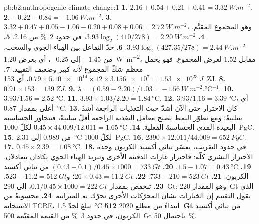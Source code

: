 \begin{solution}{pb:b2:anthropogenic-climate-change:1}
\textbf{1.} $2.16 + 0.54 + 0.21 + 0.41 = \qty{3.32}{W.m^{-2}}$.
\textbf{2.} $-0.22 - 0.84 = \qty{-1.06}{W.m^{-2}}$.
\textbf{3.} $3.32 + 0.47 + 0.05 - 1.06 - 0.20 + 0.08 + 0.06 = \qty{2.72}{W.m^{-2}}$، وهو المجموع
المقيَّم.
\textbf{4.} $3.93\log_2(410/278) = \qty{2.20}{W.m^{-2}}$، في حدود \qty{2}{\percent} من 2.16.
\textbf{5.} $3.93\log_2(427.35/278) = \qty{2.44}{W.m^{-2}}$.
\textbf{6.} حدّ التفاعل بين الهباء الجوي والسحب، من $-1.45$ إلى $-0.25$، أي بعرض \qty{1.20}{W.m^{-2}}، مقابل 1.52 لعرض
المجموع: فهو يحمل معظم شكّ المجموع لأنه كبير وضعيف
التقييد.
\textbf{7.} $0.79 \times \num{5.10e14} \times 12 \times \num{3.156e7} = \qty{1.53e23}{J}$، أي
\qty{153}{ZJ}.
\textbf{8.} $0.91 \times 153 = \qty{139}{ZJ}$.
\textbf{9.} $\lambda = (0.59 - 2.20)/1.03 = \qty{-1.56}{W.m^{-2}.\celsius^{-1}}$.
\textbf{10.} $3.93/1.56 = \qty{2.52}{\celsius}$.
\textbf{11.} $3.93 \times 1.03/2.20 = \qty{1.84}{\celsius}$.
\textbf{12.} $3.93/1.16 = \qty{3.39}{\celsius}$، أي أعلى بمقدار \qty{0.87}{\celsius}.
\textbf{13.} كان الاحترار حتى الآن أشدّ حيث التغذيات الراجعة أشدّ سلبيةً؛ ومع تطوّر
النمط يصبح معامل التغذية الراجعة أقلّ سلبيةً، فتتجاوز الحساسية البعيدة المدى
الحساسيةَ الفعلية.
\textbf{14.} $0.45 \times 44.009/12.011 = \qty{1.65}{\celsius}$ لكلّ \qty{1000}{PgC}.
\textbf{15.} من 0.989 إلى \qty{2.31}{\celsius} لكلّ \qty{1000}{PgC}.
\textbf{16.} $2390 \times 12.011/44.009 = \qty{652}{PgC}$.
\textbf{17.} $0.45 \times 2.39 = \qty{1.08}{\celsius}$.
\textbf{18.} في حدود التقريب، يفسّر ثنائي أكسيد الكربون وحده الاحترار البشري كلّه: فاحترار
غازات الدفيئة الأخرى وتبريد الهباء الجوي يكادان يتعادلان.
\textbf{19.} $1.5 - 1.07 = \qty{0.43}{\celsius}$.
\textbf{20.} $(0.43 - 0.1)/0.45 \times 1000 = \qty{733}{Gt}$ من ثنائي أكسيد الكربون.
\textbf{21.} $733 - 210 = \qty{523}{Gt}$.
\textbf{22.} $26 \times 0.43 = \qty{11.2}{Gt}$؛ و$523 - 11.2 = \qty{512}{Gt}$.
\textbf{23.} تنخفض بمقدار $0.1/0.45 \times 1000 = \qty{222}{Gt}$، إلى \qty{290}{Gt}: وهو المقدار
\qty{220}{Gt} الذي يقول التقييم إن الخيارات بشأن المحرّكات الأخرى تحرّك به الميزانية.
\textbf{24.} محسوبةً من الاستجابة TCRE، تبلغ  لحدّ \qty{1.5}{\celsius} ابتداءً من
مطلع 2020 \textbf{\qty[text-series-to-math=true]{512}{Gt}} من ثنائي أكسيد الكربون، في حدود
\qty{3}{\percent} من القيمة المقيّمة \qty{500}{Gt} باحتمال \qty{50}{\percent}.
\end{solution}
